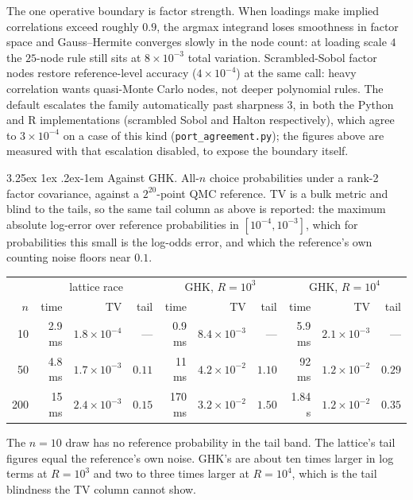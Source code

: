 \documentclass[11pt]{article}
\makeatletter
\renewcommand\paragraph{\@startsection{paragraph}{4}{\z@}%
  {3.25ex \@plus1ex \@minus.2ex}{-1em}%
  {\normalfont\normalsize\itshape}}
\makeatother
\begin{document}
The one operative boundary is factor strength. When loadings make implied
correlations exceed roughly $0.9$, the argmax integrand loses smoothness in
factor space and Gauss--Hermite converges slowly in the node count: at
loading scale $4$ the $25$-node rule still sits at $8\times10^{-3}$ total
variation. Scrambled-Sobol factor nodes restore reference-level accuracy
($4\times10^{-4}$) at the same call: heavy correlation wants
quasi-Monte Carlo nodes, not deeper polynomial rules. The default
escalates the family automatically past sharpness $3$, in both the Python
and R implementations (scrambled Sobol and Halton respectively), which
agree to $3\times10^{-4}$ on a case of this kind
(\texttt{port\_agreement.py}); the figures above are
measured with that escalation disabled, to expose the boundary itself.

\paragraph{Against GHK.} All-$n$ choice probabilities under a rank-2 factor
covariance, against a $2^{20}$-point QMC reference. TV is a bulk metric and
blind to the tails, so the same tail column as above is reported: the
maximum absolute log-error over reference probabilities in
$[10^{-4},10^{-3}]$, which for probabilities this small is the log-odds
error, and which the reference's own counting noise floors near $0.1$.

\begin{center}\small
\setlength{\tabcolsep}{4pt}
\begin{tabular}{rrrrrrrrrr}
\toprule
& \multicolumn{3}{c}{lattice race} & \multicolumn{3}{c}{GHK, $R=10^3$} & \multicolumn{3}{c}{GHK, $R=10^4$}\\
$n$ & time & TV & tail & time & TV & tail & time & TV & tail\\
\midrule
10  & 2.9 ms & $1.8\times10^{-4}$ & --- & 0.9 ms & $8.4\times10^{-3}$ & --- & 5.9 ms & $2.1\times10^{-3}$ & ---\\
50  & 4.8 ms & $1.7\times10^{-3}$ & $0.11$ & 11 ms & $4.2\times10^{-2}$ & $1.10$ & 92 ms & $1.2\times10^{-2}$ & $0.29$\\
200 & 15 ms  & $2.4\times10^{-3}$ & $0.15$ & 170 ms & $3.2\times10^{-2}$ & $1.50$ & 1.84 s & $1.2\times10^{-2}$ & $0.35$\\
\bottomrule
\end{tabular}
\end{center}

The $n=10$ draw has no reference probability in the tail band. The
lattice's tail figures equal the reference's own noise. GHK's are about
ten times larger in log terms at $R=10^3$ and two to three times larger
at $R=10^4$, which is the
tail blindness the TV column cannot show.
\end{document}
